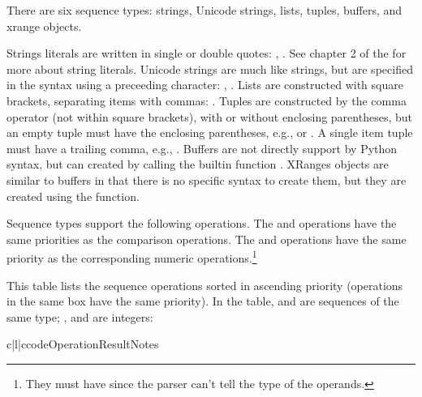 There are six sequence types: strings, Unicode strings, lists,
tuples, buffers, and xrange objects.

Strings literals are written in single or double quotes:
, .  See chapter 2 of the
 for more about
string literals.  Unicode strings are much like strings, but are
specified in the syntax using a preceeding  character:
, .  Lists are constructed with square brackets,
separating items with commas: \code{[a, b, c]}.  Tuples are
constructed by the comma operator (not within square brackets), with
or without enclosing parentheses, but an empty tuple must have the
enclosing parentheses, e.g.,  or \code{()}.  A single
item tuple must have a trailing comma, e.g., .  Buffers are
not directly support by Python syntax, but can created by calling the
builtin function .  XRanges
objects are similar to buffers in that there is no specific syntax to
create them, but they are created using the 
function.

Sequence types support the following operations.  The  and
 operations have the same priorities as the comparison
operations.  The \samp{+} and \samp{*} operations have the same
priority as the corresponding numeric operations.\footnote{They must
have since the parser can't tell the type of the operands.}

This table lists the sequence operations sorted in ascending priority
(operations in the same box have the same priority).  In the table,
 and  are sequences of the same type; , 
and  are integers:

\begin{tableiii}{c|l|c}{code}{Operation}{Result}{Notes}
  \hline
  \hline
  \hline
\end{tableiii}

